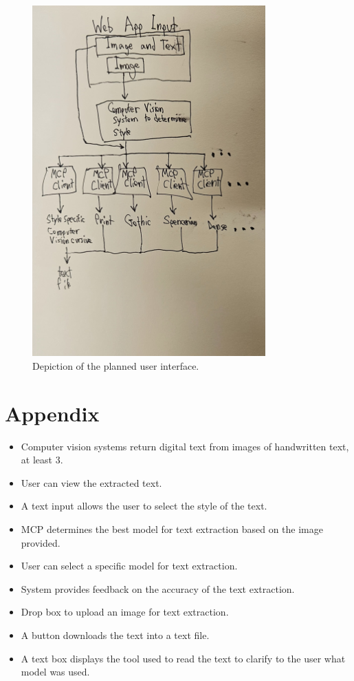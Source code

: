 \documentclass[12pt]{article}
\begin{document}
	\begin{figure}[htbp]
        \centering
		\includegraphics[width=0.8\textwidth]{./1000026679.jpg}
        \caption{Depiction of the planned user interface.}
        \label{fig:myfigure1}
    \end{figure}
\newpage
\section*{Appendix}
\begin{itemize}
	\item Computer vision systems return digital text from images of handwritten text, at least 3.
	\item User can view the extracted text.
	\item A text input allows the user to select the style of the text.
	\item MCP determines the best model for text extraction based on the image provided.
	\item User can select a specific model for text extraction.
	\item System provides feedback on the accuracy of the text extraction.
	\item Drop box to upload an image for text extraction.
	\item A button downloads the text into a text file.
	\item A text box displays the tool used to read the text to clarify to the user what model was used.
\end{itemize}




\end{document}
